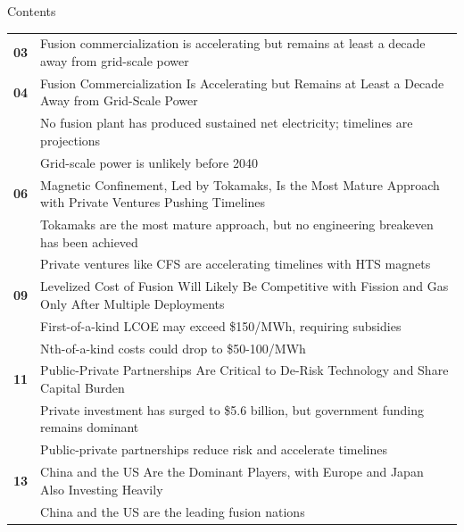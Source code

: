 \documentclass[10pt,a4paper]{article}
\begin{document}
\clearpage
{\sffamily\fontsize{26}{31}\selectfont\color{BONavy} Contents}\par\vspace{10pt}
\begin{tabularx}{\linewidth}{p{14mm}Y}
\textcolor{BOGreen}{\bfseries 03} & Fusion commercialization is accelerating but remains at least a decade away from grid-scale power \\[5pt]
\textcolor{BOGreen}{\bfseries 04} & Fusion Commercialization Is Accelerating but Remains at Least a Decade Away from Grid-Scale Power \\[5pt]
 & {\scriptsize\color{BOMuted} No fusion plant has produced sustained net electricity; timelines are projections} \\[1pt]
 & {\scriptsize\color{BOMuted} Grid-scale power is unlikely before 2040} \\[1pt]
\textcolor{BOGreen}{\bfseries 06} & Magnetic Confinement, Led by Tokamaks, Is the Most Mature Approach with Private Ventures Pushing Timelines \\[5pt]
 & {\scriptsize\color{BOMuted} Tokamaks are the most mature approach, but no engineering breakeven has been achieved} \\[1pt]
 & {\scriptsize\color{BOMuted} Private ventures like CFS are accelerating timelines with HTS magnets} \\[1pt]
\textcolor{BOGreen}{\bfseries 09} & Levelized Cost of Fusion Will Likely Be Competitive with Fission and Gas Only After Multiple Deployments \\[5pt]
 & {\scriptsize\color{BOMuted} First-of-a-kind LCOE may exceed \$150/MWh, requiring subsidies} \\[1pt]
 & {\scriptsize\color{BOMuted} Nth-of-a-kind costs could drop to \$50-100/MWh} \\[1pt]
\textcolor{BOGreen}{\bfseries 11} & Public-Private Partnerships Are Critical to De-Risk Technology and Share Capital Burden \\[5pt]
 & {\scriptsize\color{BOMuted} Private investment has surged to \$5.6 billion, but government funding remains dominant} \\[1pt]
 & {\scriptsize\color{BOMuted} Public-private partnerships reduce risk and accelerate timelines} \\[1pt]
\textcolor{BOGreen}{\bfseries 13} & China and the US Are the Dominant Players, with Europe and Japan Also Investing Heavily \\[5pt]
 & {\scriptsize\color{BOMuted} China and the US are the leading fusion nations} \\[1pt]

\end{tabularx}
\end{document}
